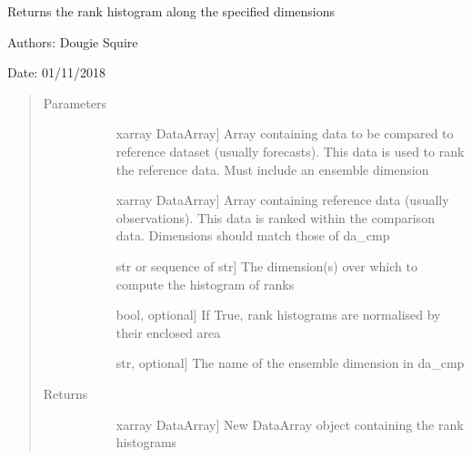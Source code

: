 \documentclass[letterpaper,10pt,english]{sphinxmanual}
\begin{document}
\begin{fulllineitems}
\label{\detokenize{skill_doc:skill.rank_histogram}}
Returns the rank histogram along the specified dimensions

\begin{DUlineblock}{0em}
\item[] Authors: Dougie Squire
\item[] Date: 01/11/2018
\end{DUlineblock}
\begin{quote}\begin{description}
\item[{Parameters}] \leavevmode\begin{description}
\item[{}] \leavevmode{[}xarray DataArray{]}
Array containing data to be compared to reference dataset (usually forecasts). This data                     is used to rank the reference data. Must include an ensemble dimension

\item[{}] \leavevmode{[}xarray DataArray{]}
Array containing reference data (usually observations). This data is ranked within the                     comparison data. Dimensions should match those of da\_cmp

\item[{}] \leavevmode{[}str or sequence of str{]}
The dimension(s) over which to compute the histogram of ranks

\item[{}] \leavevmode{[}bool, optional{]}
If True, rank histograms are normalised by their enclosed area

\item[{}] \leavevmode{[}str, optional{]}
The name of the ensemble dimension in da\_cmp

\end{description}

\item[{Returns}] \leavevmode\begin{description}
\item[{}] \leavevmode{[}xarray DataArray{]}
New DataArray object containing the rank histograms


\end{description}
\end{description}
\end{quote}
\end{fulllineitems}
\end{document}
